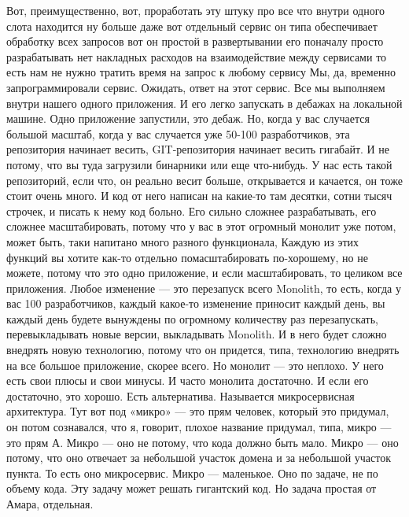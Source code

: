 \documentclass[12pt]{article} %
\begin{document}
Вот, преимущественно, вот,  проработать эту штуку про все что внутри одного слота находится ну больше даже вот отдельный сервис он типа обеспечивает обработку всех запросов вот он простой в развертывании его поначалу просто разрабатывать нет накладных расходов на взаимодействие между сервисами то есть нам не нужно тратить время на запрос к любому сервису Мы, да, временно запрограммировали сервис.  Ожидать, ответ на этот сервис.  Все мы выполняем внутри нашего одного приложения.  И его легко запускать в дебажах на локальной машине.  Одно приложение запустили, это дебаж.  Но, когда у вас случается большой масштаб, когда у вас случается уже 50-100 разработчиков, эта репозитория начинает весить, GIT-репозитория начинает весить гигабайт.  И не потому, что вы туда загрузили бинарники или еще что-нибудь.  У нас есть такой репозиторий, если что, он реально весит больше, открывается и качается, он тоже стоит очень много.  И код от него написан на какие-то там десятки, сотни тысяч строчек, и писать к нему код больно.  Его сильно сложнее разрабатывать, его сложнее масштабировать, потому что у вас в этот огромный монолит уже потом, может быть, таки напитано много разного функционала, Каждую из этих функций вы хотите как-то отдельно помасштабировать по-хорошему, но не можете, потому что это одно приложение, и если масштабировать, то целиком все приложения.  Любое изменение — это перезапуск всего Monolith, то есть, когда у вас 100 разработчиков, каждый какое-то изменение приносит каждый день, вы каждый день будете вынуждены по огромному количеству раз перезапускать, перевыкладывать новые версии, выкладывать Monolith.  И в него будет сложно внедрять новую технологию, потому что он придется, типа, технологию внедрять на все большое приложение, скорее всего.  Но монолит — это неплохо. У него есть свои плюсы и свои минусы.  И часто монолита достаточно. И если его достаточно, это хорошо.  Есть альтернатива. Называется микросервисная архитектура.  Тут вот под «микро» — это прям человек, который это придумал, он потом сознавался, что я, говорит, плохое название придумал, типа, микро — это прям А.  Микро — оно не потому, что кода должно быть мало.  Микро — оно потому, что оно отвечает за небольшой участок домена и за небольшой участок пункта.  То есть оно микросервис.  Микро — маленькое.  Оно по задаче, не по объему кода.  Эту задачу может решать гигантский код.  Но задача простая от Амара, отдельная.
\end{document}
